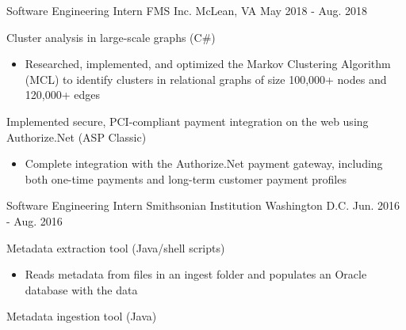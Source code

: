 \begin{cventries}
    \cventry
    {Software Engineering Intern}
	{FMS Inc.}
    {McLean, VA}
    {May 2018 - Aug. 2018}
    {
        \begin{cvitems}
		\item{Cluster analysis in large-scale graphs (C\#)}
			\begin{itemize}
				\item{Researched, implemented, and optimized the Markov Clustering Algorithm (MCL) to identify clusters in relational graphs of size 100,000+ nodes and 120,000+ edges}
			\end{itemize}
		\item{Implemented secure, PCI-compliant payment integration on the web using Authorize.Net (ASP Classic)}
			\begin{itemize}
				\item{Complete integration with the Authorize.Net payment gateway, including both one-time payments and long-term customer payment profiles}
			\end{itemize}
        \end{cvitems}
    }
    \cventry
    {Software Engineering Intern}
    {Smithsonian Institution}
    {Washington D.C.}
    {Jun. 2016 - Aug. 2016}
    {
        \begin{cvitems}
		\item{Metadata extraction tool (Java/shell scripts)}
        \begin{itemize}
			\item{Reads metadata from files in an ingest folder and populates an Oracle database with the data}
        \end{itemize}
		\item{Metadata ingestion tool (Java)}

\end{cvitems}}
\end{cventries}
